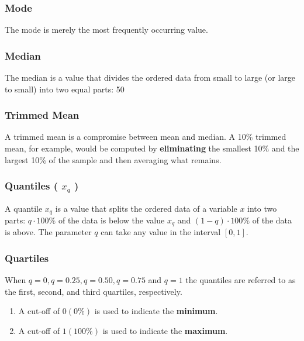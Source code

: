 \subsubsection{Mode \cite{ism-1}}\label{mode}
The mode is merely the most frequently occurring value.

\subsubsection{Median \cite{ism-1}}\label{median}
The median is a value that divides the ordered data from small to large (or large to small) into two equal parts: 50%

\subsubsection{Trimmed Mean \cite{ism-1}}\label{Trimmed Mean}
A trimmed mean is a compromise between mean and median. A 10\% trimmed mean, for example, would be computed by \textbf{eliminating} the smallest 10\% and the largest 10\% of the sample and then averaging what remains.

\subsubsection{Quantiles ( $x_q$ ) \cite{ism-1}}\label{Quantiles}
A quantile $x_q$ is a value that splits the ordered data of a variable $x$ into two parts: $q \cdot 100\%$ of the data is below the value $x_q$ and $(1 - q) \cdot 100\%$ of the data is above. The parameter $q$ can take any value in the interval $[0, 1]$.

\subsubsection{Quartiles \cite{ism-1}}\label{Quartiles}
When $q = 0, q = 0.25, q = 0.50, q = 0.75$ and $q = 1$ the quantiles are referred to as the first, second, and third quartiles, respectively.
\begin{enumerate}
    \item A cut-off of $0 (0\%)$ is used to indicate the \textbf{minimum}.
    \item A cut-off of $1 (100\%)$ is used to indicate the \textbf{maximum}.
\end{enumerate}

